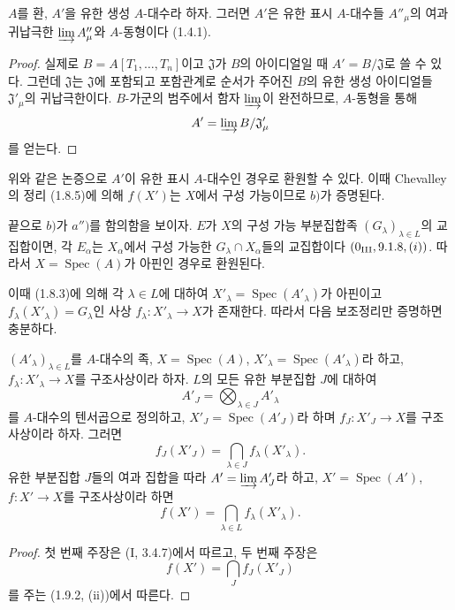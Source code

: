 \begin{lemma}[1.9.3.1]
\label{IV.1.9.3.1-fr}
$A$를 환, $A'$을 유한 생성 $A$-대수라 하자. 그러면 $A'$은 유한 표시
$A$-대수들 $A''_\mu$의 여과 귀납극한
$\varinjlim A''_\mu$와 $A$-동형이다 (1.4.1).
\end{lemma}

\begin{proof}
실제로 $B=A[T_1,\ldots,T_n]$이고 $\mathfrak J$가 $B$의 아이디얼일 때
$A'=B/\mathfrak J$로 쓸 수 있다. 그런데 $\mathfrak J$는
$\mathfrak J$에 포함되고 포함관계로 순서가 주어진 $B$의 유한 생성
아이디얼들 $\mathfrak J'_\mu$의 귀납극한이다. $B$-가군의 범주에서
함자 $\varinjlim$이 완전하므로, $A$-동형을 통해
\[
  A'=\varinjlim B/\mathfrak J'_\mu
\]
를 얻는다.
\end{proof}

위와 같은 논증으로 $A'$이 유한 표시 $A$-대수인 경우로 환원할 수
있다. 이때 Chevalley의 정리 (1.8.5)에 의해 $f(X')$는 $X$에서 구성
가능이므로 $b)$가 증명된다.

끝으로 $b)$가 $a'')$를 함의함을 보이자. $E$가 $X$의 구성 가능
부분집합족 $(G_\lambda)_{\lambda\in L}$의 교집합이면, 각 $E_\alpha$는
$X_\alpha$에서 구성 가능한 $G_\lambda\cap X_\alpha$들의 교집합이다
$(0\textsubscript{III}, 9.1.8, (i))$. 따라서
$X=\operatorname{Spec}(A)$가 아핀인 경우로 환원된다.

이때 (1.8.3)에 의해 각 $\lambda\in L$에 대하여
$X'_\lambda=\operatorname{Spec}(A'_\lambda)$가 아핀이고
$f_\lambda(X'_\lambda)=G_\lambda$인 사상
$f_\lambda:X'_\lambda\to X$가 존재한다. 따라서 다음 보조정리만
증명하면 충분하다.

\begin{lemma}[1.9.3.2]
\label{IV.1.9.3.2-fr}
$(A'_\lambda)_{\lambda\in L}$를 $A$-대수의 족,
$X=\operatorname{Spec}(A)$,
$X'_\lambda=\operatorname{Spec}(A'_\lambda)$라 하고,
$f_\lambda:X'_\lambda\to X$를 구조사상이라 하자. $L$의 모든 유한
부분집합 $J$에 대하여
\[
  A'_J=\bigotimes_{\lambda\in J}A'_\lambda
\]
를 $A$-대수의 텐서곱으로 정의하고,
$X'_J=\operatorname{Spec}(A'_J)$라 하며 $f_J:X'_J\to X$를
구조사상이라 하자. 그러면
\[
  f_J(X'_J)=\bigcap_{\lambda\in J}f_\lambda(X'_\lambda).
\]
유한 부분집합 $J$들의 여과 집합을 따라
$A'=\varinjlim A'_J$라 하고, $X'=\operatorname{Spec}(A')$,
$f:X'\to X$를 구조사상이라 하면
\[
  f(X')=\bigcap_{\lambda\in L}f_\lambda(X'_\lambda).
\]
\end{lemma}

\begin{proof}
첫 번째 주장은 (I, 3.4.7)에서 따르고, 두 번째 주장은
\[
  f(X')=\bigcap_Jf_J(X'_J)
\]
를 주는 (1.9.2, (ii))에서 따른다.
\end{proof}

